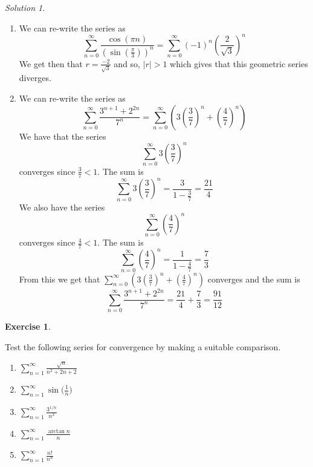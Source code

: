 \documentclass[
]{book}
\providecommand{\tightlist}{%
  \setlength{\itemsep}{0pt}\setlength{\parskip}{0pt}}
\theoremstyle{definition}
\theoremstyle{definition}
\theoremstyle{definition}
\newtheorem{exercise}{Exercise}[chapter]
\theoremstyle{definition}
\theoremstyle{remark}
\newtheorem*{solution}{Solution}
\begin{document}
\begin{solution}

\begin{enumerate}
\def\labelenumi{\arabic{enumi}.}
\item
  We can re-write the series as \[\sum_{n=0}^{\infty} \frac{\cos{(\pi n)}}{(\sin{\left(\frac{\pi}{3}\right)})^n}=\sum_{n=0}^{\infty}(-1)^n\left(\frac{2}{\sqrt{3}}\right)^n\]
  We get then that \(\displaystyle r= \frac{-2}{\sqrt{3}}\) and so, \(|r|>1\) which gives that this geometric series diverges.
\item
  We can re-write the series as \[ \sum_{n=0}^{\infty} \frac{3^{n+1}+2^{2n}}{7^n}=\sum_{n=0}^{\infty}\left( 3\left(\frac{3}{7}\right)^n+\left(\frac{4}{7}\right)^n\right)\]
  We have that the series \[\sum_{n=0}^{\infty}3\left(\frac{3}{7}\right)^n\]
  converges since \(\displaystyle \frac{3}{7} <1\). The sum is \[\sum_{n=0}^{\infty}3\left(\frac{3}{7}\right)^n=\frac{3}{1-\frac{3}{7}}=\frac{21}{4}\]
  We also have the series \[\sum_{n=0}^{\infty}\left(\frac{4}{7}\right)^n\] converges since \(\displaystyle \frac{4}{7}<1\). The sum is \[\sum_{n=0}^{\infty}\left(\frac{4}{7}\right)^n=\frac{1}{1-\frac{4}{7}}=\frac{7}{3}\]
  From this we get that \(\displaystyle \sum_{n=0}^{\infty}\left( 3\left(\frac{3}{7}\right)^n+\left(\frac{4}{7}\right)^n\right)\) converges and the sum is \[\sum_{n=0}^{\infty} \frac{3^{n+1}+2^{2n}}{7^n}=\frac{21}{4}+\frac{7}{3}=\frac{91}{12}\]
\end{enumerate}

\end{solution}

\begin{exercise}
\protect\hypertarget{exr:unlabeled-div-281}{}\label{exr:unlabeled-div-281}

Test the following series for convergence by making a suitable comparison.

\begin{enumerate}
\def\labelenumi{\arabic{enumi}.}
\tightlist
\item
  \(\sum_{n=1}^{\infty} \frac{\sqrt{n}}{n^2+2n+2}\)
\item
  \(\displaystyle \sum_{n=1}^{\infty} \sin\bigg(\frac{1}{n}\bigg)\)
\item
  \(\displaystyle \sum_{n=1}^{\infty} \frac{3^{1/n}}{n^3}\)
\item
  \(\displaystyle \sum_{n=1}^{\infty} \frac{\arctan n}{n}\)
\item
  \(\displaystyle \sum_{n=1}^{\infty} \frac{n!}{n^n}\)
\end{enumerate}

\end{exercise}
\end{document}
